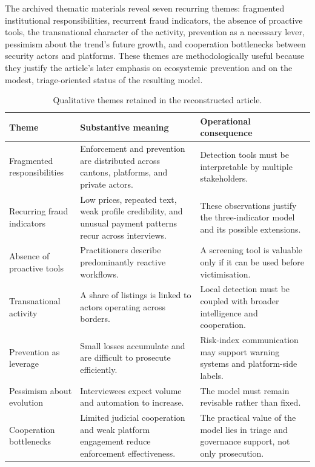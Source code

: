 \documentclass[11pt,a4paper]{article}
\begin{document}
The archived thematic materials reveal seven recurring themes: fragmented institutional responsibilities, recurrent fraud indicators, the absence of proactive tools, the transnational character of the activity, prevention as a necessary lever, pessimism about the trend's future growth, and cooperation bottlenecks between security actors and platforms. These themes are methodologically useful because they justify the article's later emphasis on ecosystemic prevention and on the modest, triage-oriented status of the resulting model.

\begin{table}[H]
\centering
\caption{Qualitative themes retained in the reconstructed article.}
\begin{tabularx}{\textwidth}{p{3.5cm} Y Y}
\toprule
\textbf{Theme} & \textbf{Substantive meaning} & \textbf{Operational consequence} \\
\midrule
Fragmented responsibilities & Enforcement and prevention are distributed across cantons, platforms, and private actors. & Detection tools must be interpretable by multiple stakeholders. \\
Recurring fraud indicators & Low prices, repeated text, weak profile credibility, and unusual payment patterns recur across interviews. & These observations justify the three-indicator model and its possible extensions. \\
Absence of proactive tools & Practitioners describe predominantly reactive workflows. & A screening tool is valuable only if it can be used before victimisation. \\
Transnational activity & A share of listings is linked to actors operating across borders. & Local detection must be coupled with broader intelligence and cooperation. \\
Prevention as leverage & Small losses accumulate and are difficult to prosecute efficiently. & Risk-index communication may support warning systems and platform-side labels. \\
Pessimism about evolution & Interviewees expect volume and automation to increase. & The model must remain revisable rather than fixed. \\
Cooperation bottlenecks & Limited judicial cooperation and weak platform engagement reduce enforcement effectiveness. & The practical value of the model lies in triage and governance support, not only prosecution. \\
\bottomrule
\end{tabularx}
\end{table}
\end{document}
